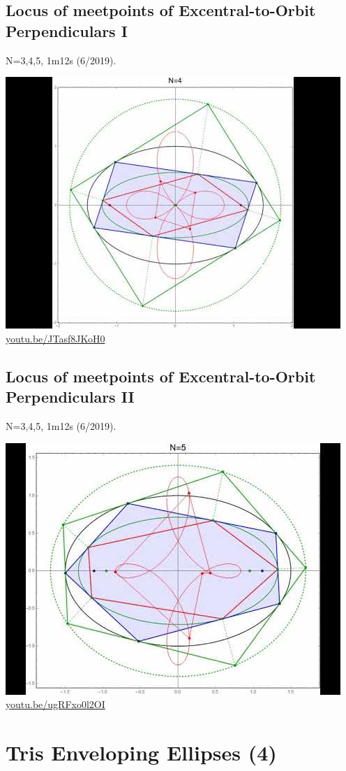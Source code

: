 \documentclass[12pt]{amsart}
\begin{document}
\subsection{Locus of meetpoints of Excentral-to-Orbit Perpendiculars I}
\label{vid:JTasf8JKoH0}
\noindent N=3,4,5, 1m12s (6/2019). 
\begin{center}\includegraphics[width=.5\textwidth]{pics/JTasf8JKoH0.jpg} \\ 
\href{https://youtu.be/JTasf8JKoH0}{\url{youtu.be/JTasf8JKoH0}}\end{center}
% 
\subsection{Locus of meetpoints of Excentral-to-Orbit Perpendiculars II}
\label{vid:ugRFxo0l2OI}
\noindent N=3,4,5, 1m12s (6/2019). 
\begin{center}\includegraphics[width=.5\textwidth]{pics/ugRFxo0l2OI.jpg} \\ 
\href{https://youtu.be/ugRFxo0l2OI}{\url{youtu.be/ugRFxo0l2OI}}\end{center}
% 

\section{Tris Enveloping Ellipses (4)}
\end{document}
